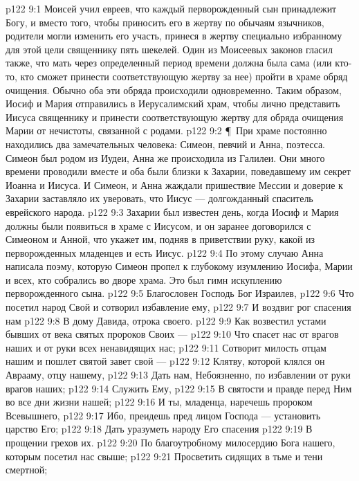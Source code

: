 \vs p122 9:1 Моисей учил евреев, что каждый перворожденный сын принадлежит Богу, и вместо того, чтобы приносить его в жертву по обычаям язычников, родители могли изменить его участь, принеся в жертву специально избранному для этой цели священнику пять шекелей. Один из Моисеевых законов гласил также, что мать через определенный период времени должна была сама (или кто\hyp{}то, кто сможет принести соответствующую жертву за нее) пройти в храме обряд очищения. Обычно оба эти обряда происходили одновременно. Таким образом, Иосиф и Мария отправились в Иерусалимский храм, чтобы лично представить Иисуса священнику и принести соответствующую жертву для обряда очищения Марии от нечистоты, связанной с родами.
\vs p122 9:2 \P\ При храме постоянно находились два замечательных человека: Симеон, певчий и Анна, поэтесса. Симеон был родом из Иудеи, Анна же происходила из Галилеи. Они много времени проводили вместе и оба были близки к Захарии, поведавшему им секрет Иоанна и Иисуса. И Симеон, и Анна жаждали пришествие Мессии и доверие к Захарии заставляло их уверовать, что Иисус --- долгожданный спаситель еврейского народа.
\vs p122 9:3 Захарии был известен день, когда Иосиф и Мария должны были появиться в храме с Иисусом, и он заранее договорился с Симеоном и Анной, что укажет им, подняв в приветствии руку, какой из перворожденных младенцев и есть Иисус.
\vs p122 9:4 По этому случаю Анна написала поэму, которую Симеон пропел к глубокому изумлению Иосифа, Марии и всех, кто собрались во дворе храма. Это был гимн искуплению перворожденного сына.
\vs p122 9:5 Благословен Господь Бог Израилев,
\vs p122 9:6 Что посетил народ Свой и сотворил избавление ему,
\vs p122 9:7 И воздвиг рог спасения нам
\vs p122 9:8 В дому Давида, отрока своего.
\vs p122 9:9 Как возвестил устами бывших от века святых пророков Своих ---
\vs p122 9:10 Что спасет нас от врагов наших и от руки всех ненавидящих нас;
\vs p122 9:11 Сотворит милость отцам нашим и пошлет святой завет свой ---
\vs p122 9:12 Клятву, которой клялся он Аврааму, отцу нашему,
\vs p122 9:13 Дать нам, Небоязненно, по избавлении от руки врагов наших;
\vs p122 9:14 Служить Ему,
\vs p122 9:15 В святости и правде перед Ним во все дни жизни нашей;
\vs p122 9:16 И ты, младенца, наречешь пророком Всевышнего,
\vs p122 9:17 Ибо, преидешь пред лицом Господа --- установить царство Его;
\vs p122 9:18 Дать уразуметь народу Его спасения
\vs p122 9:19 В прощении грехов их.
\vs p122 9:20 По благоутробному милосердию Бога нашего, которым посетил нас свыше;
\vs p122 9:21 Просветить сидящих в тьме и тени смертной;
